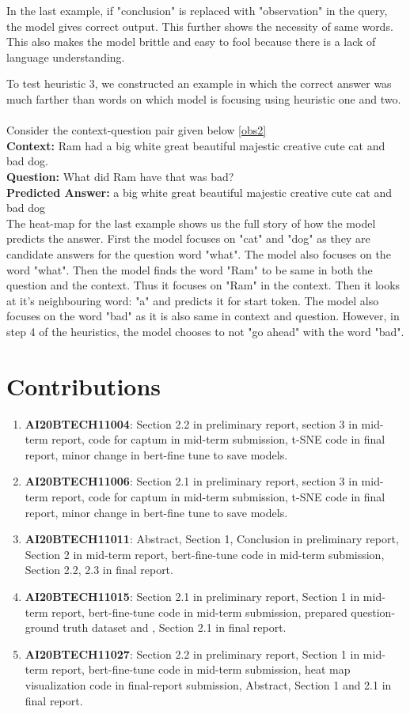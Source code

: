 \documentclass[10pt,twocolumn,letterpaper]{article}
\begin{document}
In the last example, if "conclusion" is replaced with "observation" in the query, the model gives correct output. This further shows the necessity of same words. This also makes the model brittle and easy to fool because there is a lack of language understanding.

To test heuristic 3, we constructed an example in which the correct answer was much farther than words on which model is focusing using heuristic one and two.\\\\Consider the context-question pair given below \ref{obs2}\\
\textbf{Context: } Ram had a big white great beautiful majestic creative cute cat and bad dog.\\
\textbf{Question: } What did Ram have that was bad?\\
\textbf{Predicted Answer: } a big white great beautiful majestic creative cute cat and bad dog \\

The heat-map for the last example shows us the full story of how the model predicts the answer. First the model focuses on "cat" and "dog" as they are candidate answers for the question word "what". The model also focuses on the word "what". Then the model finds the word "Ram" to be same in both the question and the context. Thus it focuses on "Ram" in the context. Then it looks at it's neighbouring word: "a" and predicts it for start token. The model also focuses on the word "bad" as it is also same in context and question. However, in step 4 of the heuristics, the model chooses to not "go ahead" with the word "bad". 
\section{Contributions}
\begin{enumerate}
    \item \textbf{AI20BTECH11004}: Section 2.2 in preliminary report, section 3 in mid-term report, code for captum in mid-term submission, t-SNE code in final report, minor change in bert-fine tune to save models.
    \item \textbf{AI20BTECH11006}: Section 2.1 in preliminary report, section 3 in mid-term report, code for captum in mid-term submission, t-SNE code in final report, minor change in bert-fine tune to save models.
    \item \textbf{AI20BTECH11011}: Abstract, Section 1, Conclusion in preliminary report, Section 2 in mid-term report, bert-fine-tune code in mid-term submission, Section 2.2, 2.3 in final report.
    \item \textbf{AI20BTECH11015}: Section 2.1 in preliminary report, Section 1 in mid-term report, bert-fine-tune code in mid-term submission, prepared question-ground truth dataset and , Section 2.1 in final report.
    \item \textbf{AI20BTECH11027}: Section 2.2 in preliminary report, Section 1 in mid-term report, bert-fine-tune code in mid-term submission, heat map visualization code in final-report submission, Abstract, Section 1 and 2.1 in final report.
\end{enumerate}

{\small


}
\end{document}
